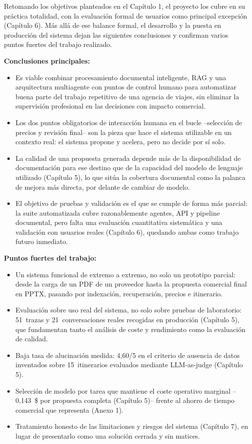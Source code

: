 \clearpage
{}

Retomando los objetivos planteados en el Capítulo 1, el proyecto los cubre en su práctica totalidad, con la evaluación formal de usuarios como principal excepción (Capítulo 6). Más allá de ese balance formal, el desarrollo y la puesta en producción del sistema dejan las siguientes conclusiones y confirman varios puntos fuertes del trabajo realizado.

\textbf{Conclusiones principales:}
\begin{itemize}
\item Es viable combinar procesamiento documental inteligente, RAG y una arquitectura multiagente con puntos de control humano para automatizar buena parte del trabajo repetitivo de una agencia de viajes, sin eliminar la supervisión profesional en las decisiones con impacto comercial.
\item Los dos puntos obligatorios de interacción humana en el bucle --selección de precios y revisión final-- son la pieza que hace el sistema utilizable en un contexto real: el sistema propone y acelera, pero no decide por sí solo.
\item La calidad de una propuesta generada depende más de la disponibilidad de documentación para ese destino que de la capacidad del modelo de lenguaje utilizado (Capítulo 5), lo que sitúa la cobertura documental como la palanca de mejora más directa, por delante de cambiar de modelo.
\item El objetivo de pruebas y validación es el que se cumple de forma más parcial: la suite automatizada cubre razonablemente agentes, API y pipeline documental, pero falta una evaluación cuantitativa sistemática y una validación con usuarios reales (Capítulo 6), quedando ambas como trabajo futuro inmediato.
\end{itemize}

\textbf{Puntos fuertes del trabajo:}
\begin{itemize}
\item Un sistema funcional de extremo a extremo, no solo un prototipo parcial: desde la carga de un PDF de un proveedor hasta la propuesta comercial final en PPTX, pasando por indexación, recuperación, precios e itinerario.
\item Evaluación sobre uso real del sistema, no solo sobre pruebas de laboratorio: 51~trazas y 21~conversaciones reales recogidas en producción (Capítulo 5), que fundamentan tanto el análisis de coste y rendimiento como la evaluación de calidad.
\item Baja tasa de alucinación medida: 4,60/5 en el criterio de ausencia de datos inventados sobre 15~itinerarios evaluados mediante LLM-as-judge (Capítulo 5).
\item Selección de modelo por tarea que mantiene el coste operativo marginal --0,143~\$ por propuesta completa (Capítulo 5)-- frente al ahorro de tiempo comercial que representa (Anexo 1).
\item Tratamiento honesto de las limitaciones y riesgos del sistema (Capítulo 7), en lugar de presentarlo como una solución cerrada y sin matices.
\end{itemize}

